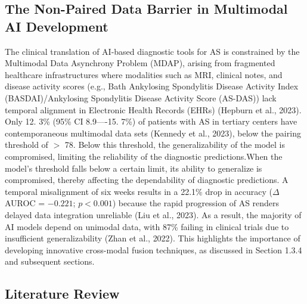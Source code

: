 \documentclass[12pt, a4paper]{article}
\begin{document}
\subsection{The Non-Paired Data Barrier in Multimodal AI Development}
The clinical translation of AI-based diagnostic tools for AS is constrained by the Multimodal Data Asynchrony Problem (MDAP), arising from fragmented healthcare infrastructures where modalities such as MRI, clinical notes, and disease activity scores (e.g., Bath Ankylosing Spondylitis Disease Activity Index (BASDAI)/Ankylosing Spondylitis Disease Activity Score (AS-DAS)) lack temporal alignment in Electronic Health Records (EHRs) (Hepburn et al., 2023). Only 12. 3\% (95\% CI 8.9----15. 7\%) of patients with AS in tertiary centers have contemporaneous multimodal data sets (Kennedy et al., 2023), below the pairing threshold of $>$ 78. Below this threshold, the generalizability of the model is compromised, limiting the reliability of the diagnostic predictions.When the model's threshold falls below a certain limit, its ability to generalize is compromised, thereby affecting the dependability of diagnostic predictions. A temporal misalignment of six weeks results in a 22.1\% drop in accuracy ($\Delta$AUROC = $-0.221$; $p < 0.001$) because the rapid progression of AS renders delayed data integration unreliable (Liu et al., 2023). As a result, the majority of AI models depend on unimodal data, with 87\% failing in clinical trials due to insufficient generalizability (Zhan et al., 2022). This highlights the importance of developing innovative cross-modal fusion techniques, as discussed in Section 1.3.4 and subsequent sections.


\subsection{Literature Review}
\end{document}
